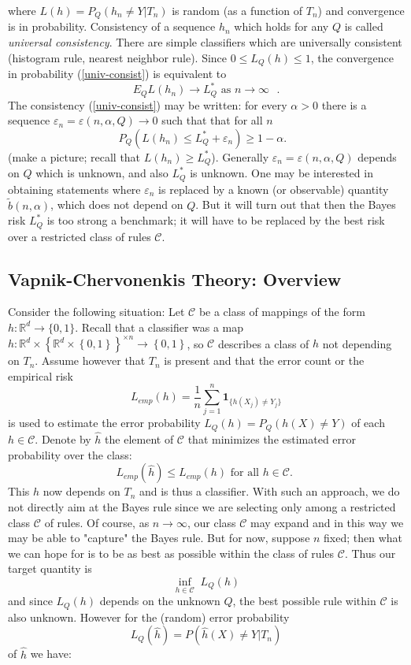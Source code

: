 \documentclass[11pt,twoside]{article}%
\theoremstyle{change}
\begin{document}
where $L(h)=P_{Q}\left(  h_{n}\neq Y|T_{n}\right)  $ is random (as a function
of $T_{n}$) and convergence is in probability. Consistency of a sequence
$h_{n}$ which holds for any $Q$ is called \textit{universal consistency}.
There are simple classifiers which are universally consistent (histogram rule,
nearest neighbor rule). Since $0\leq L_{Q}(h)\leq1$, the convergence in
probability (\ref{univ-consist}) is equivalent to
\[
E_{Q}L(h_{n})\rightarrow L_{Q}^{\ast}\text{ as }n\rightarrow\infty\text{ }.
\]
The consistency (\ref{univ-consist}) may be written: for every $\alpha>0$
there is a sequence $\varepsilon_{n}=\varepsilon(n,\alpha,Q)\rightarrow0$ such
that that for all $n$%
\[
P_{Q}\left(  L(h_{n})\leq L_{Q}^{\ast}+\varepsilon_{n}\right)  \geq
1-\alpha.\text{ }%
\]
(make a picture; recall that $L(h_{n})\geq L_{Q}^{\ast}$). Generally
$\varepsilon_{n}=\varepsilon(n,\alpha,Q)$ depends on $Q$ which is unknown, and
also $L_{Q}^{\ast}$ is unknown. One may be interested in obtaining statements
where $\varepsilon_{n}$ is replaced by a known (or observable) quantity
$\tilde{b}(n,\alpha)$, which does not depend on $Q$. But it will turn out that
then the Bayes risk $L_{Q}^{\ast}$ is too strong a benchmark; it will have to
be replaced by the best risk over a restricted class of rules $\mathcal{C}$.

\subsection{Vapnik-Chervonenkis Theory: Overview}

Consider the following situation: Let $\mathcal{C}$ be a class of mappings of
the form $h:\mathbb{R}^{d}\rightarrow\{0,1\}$. Recall that a classifier was a
map $h:\mathbb{R}^{d}\times\left\{  \mathbb{R}^{d}\times\left\{  0,1\right\}
\right\}  ^{\times n}\rightarrow\left\{  0,1\right\}  $, so $\mathcal{C}$
describes a class of $h$ not depending on $T_{n}$. Assume however that $T_{n}$
is present and that the error count or the empirical risk
\[
L_{emp}(h)=\frac{1}{n}\sum_{j=1}^{n}\mathbf{1}_{\{h(X_{j})\neq Y_{j}\}}%
\]
is used to estimate the error probability $L_{Q}(h)=P_{Q}\left(  h(X)\neq
Y\right)  $ of each $h\in\mathcal{C}$. Denote by $\hat{h}$ the element of
$\mathcal{C}$ that minimizes the estimated error probability over the class:%
\[
L_{emp}(\hat{h})\leq L_{emp}(h)\text{ for all }h\in\mathcal{C}\text{. }%
\]
This $\hat{h}$ now depends on $T_{n}$ and is thus a classifier. With such an
approach, we do not directly aim at the Bayes rule since we are selecting only
among a restricted class $\mathcal{C}$ of rules. Of course, as $n\rightarrow
\infty$, our class $\mathcal{C}$ may expand and in this way we may be able to
"capture" the Bayes rule. But for now, suppose $n$ fixed; then what we can
hope for is to be as best as possible within the class of rules $\mathcal{C}$.
Thus our target quantity is
\[
\inf_{h\in\mathcal{C}}\;L_{Q}(h)
\]
and since $L_{Q}(h)$ depends on the unknown $Q$, the best possible rule within
$\mathcal{C}$ is also unknown. However for the (random) error probability%
\[
L_{Q}(\hat{h})=P\left(  \hat{h}(X)\neq Y|T_{n}\right)
\]
of $\hat{h}$ we have:
\end{document}
